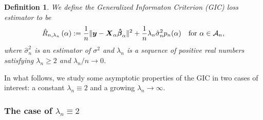 \documentclass[11pt, letter paper]{article}
\newcommand{\1}{\mathmybb{1}}
\newtheorem{definition}{Definition}[section]
\newcommand{\0}{\emptyset}
\newcommand{\paren}[1]{\left(#1 \right)}
\newcommand{\norm}[1]{|\hspace{-1pt}|#1 |\hspace{-1pt}|}
\newcommand{\normsq}[1]{\norm{#1}^{2}}
\newcommand{\Acal}{\mathcal{A}_{n}}
\newcommand{\X}{\boldsymbol{X}}
\newcommand{\y}{\boldsymbol{y}}
\newcommand{\bbetahat}{\boldsymbol{\hat{\beta}}}
\newcommand{\Rhat}[2]{\hat{R}_{n, #1}\paren{#2}}
\newcommand{\sigmahat}{\hat{\sigma}^{2}_{n}}
\begin{document}
\begin{definition}\label{def:gic}
    We define the Generalized Informaton Criterion (GIC) loss estimator to be
    \[\Rhat{\lambda_{n}}{\alpha} := \frac{1}{n}\normsq{\y - \X_{\alpha}\bbetahat_{\alpha}} + \frac{1}{n}\lambda_{n}\sigmahat p_{n}(\alpha)\quad\text{for }\alpha\in\Acal,\]
    where \(\sigmahat\) is an estimator of \(\sigma^{2}\) and \(\lambda_{n}\) is a sequence of positive real numbers satisfying \(\lambda_{n}\geq 2\) and \(\lambda_{n}/n\to 0\).
\end{definition}

In what follows, we study some asymptotic properties of the GIC in two cases of interest: a constant \(\lambda_{n}\equiv 2\) and a growing \(\lambda_{n}\to\infty\).

\subsubsection{The case of \(\lambda_{n} \equiv 2\)}
\end{document}
